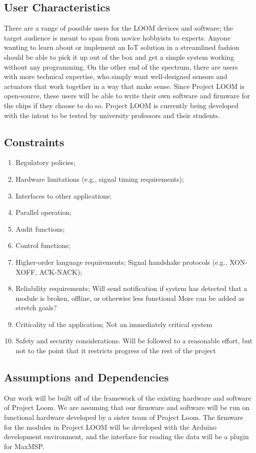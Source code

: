 \documentclass[onecolumn, draftclsnofoot,10pt, compsoc]{IEEEtran}
\begin{document}
	\subsection{User Characteristics}
	There are a range of possible users for the LOOM devices and software; the target audience is meant to span from novice hobbyists to experts. Anyone wanting to learn about or implement an IoT solution in a streamlined fashion should be able to pick it up out of the box and get a simple system working without any programming. On the other end of the spectrum, there are users with more technical expertise, who simply want well-designed sensors and actuators that work together in a way that make sense. Since Project LOOM is open-source, these users will be able to write their own software and firmware for the chips if they choose to do so.
	Project LOOM is currently being developed with the intent to be tested by university professors and their students.

	\subsection{Constraints}
		\begin{enumerate}
			\item Regulatory policies;
			\item Hardware limitations (e.g., signal timing requirements);
			\item Interfaces to other applications;
			\item Parallel operation;
			\item Audit functions;
			\item Control functions;
			\item Higher-order language requirements;
				Signal handshake protocols (e.g., XON-XOFF, ACK-NACK);
			\item Reliability requirements;
					Will send notification if system has detected that a module is broken, offline, or otherwise less functional
					More can be added as stretch goals?
			\item Criticality of the application;
					Not an immediately critical system
			\item Safety and security considerations.
					Will be followed to a reasonable effort, but not to the point that it restricts progress of the rest of the project
		\end{enumerate}
		
	\subsection{Assumptions and Dependencies}
	Our work will be built off of the framework of the existing hardware and software of Project Loom. We are assuming that our firmware and software will be run on functional hardware developed by a sister team of Project Loom. The firmware for the modules in Project LOOM will be developed with the Arduino development environment, and the interface for reading the data will be a plugin for MaxMSP.
\end{document}
